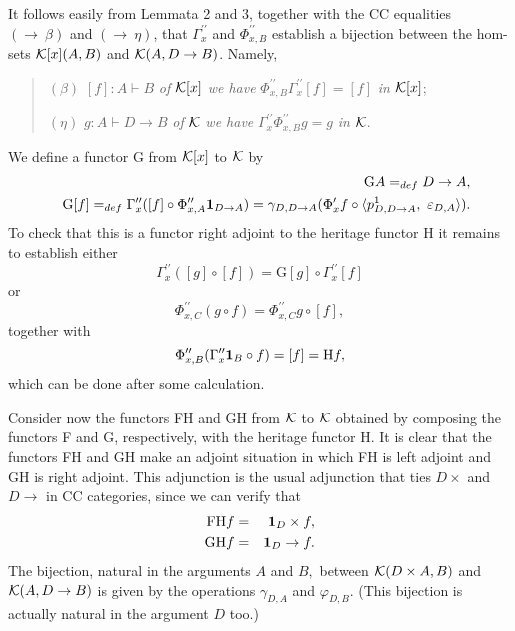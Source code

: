 \noindent It follows easily from Lemmata 2 and 3, together with the CC
equalities $(\rightarrow ~\beta )$ and $(\rightarrow ~\eta )$, that $\Gamma
_{x}^{\prime \prime }$ and $\Phi _{x,B}^{\prime \prime }$ establish a
bijection between the hom-sets ${\cal K}[x](A,B)$ and ${\cal K}%
(A,D\rightarrow B)$. Namely,

\begin{quotation}
\noindent $(\beta )$ $[f]:A\vdash B$ {\it of} ${\cal K}%
[x]$ {\it we have} $\Phi _{x,B}^{\prime \prime }\Gamma _{x}^{\prime \prime
}[f]=[f]$ {\it in} ${\cal K}[x]$;\medskip

\noindent $(\eta )$ $g:A\vdash D\rightarrow B$ {\it of} 
${\cal K}$ {\it we have} $\Gamma _{x}^{\prime \prime }\Phi _{x,B}^{\prime
\prime }g=g$ {\it in} ${\cal K}$.
\end{quotation}

We define a functor G from ${\cal K}[x]$ to ${\cal K}$ by 
\begin{eqnarray*}
&&\text{G}A=_{def}D\rightarrow A, \\
&&\text{G}[f]=_{def}\Gamma _{x}^{\prime \prime }([f]\circ \Phi
_{x,A}^{\prime \prime }{\bf 1}_{D\rightarrow A})=\gamma _{D,D\rightarrow
A}(\Phi _{x}^{\prime }f\circ \langle p_{D,D\rightarrow A}^{1},~\varepsilon
_{D,A}\rangle ).
\end{eqnarray*}
To check that this is a functor right adjoint to the heritage functor H it
remains to establish either 
\[
\Gamma _{x}^{\prime \prime }([g]\circ [f])=\text{G}[g]\circ \Gamma
_{x}^{\prime \prime }[f] 
\]
or 
\[
\Phi _{x,C}^{\prime \prime }(g\circ f)=\Phi _{x,C}^{\prime \prime }g\circ
[f], 
\]
together with 
\[
\Phi _{x,B}^{\prime \prime }(\Gamma _{x}^{\prime \prime }{\bf 1}_{B}\circ
f)=[f]=\text{H}f, 
\]
which can be done after some calculation.

Consider now the functors FH and GH from ${\cal K}$ to ${\cal K}$ obtained
by composing the functors F and G, respectively, with the heritage functor
H. It is clear that the functors FH and GH make an adjoint situation in
which FH is left adjoint and GH is right adjoint. This adjunction is the
usual adjunction that ties $D\times $ and $D\rightarrow $ in CC categories,
since we can verify that 
\begin{eqnarray*}
\text{FH}f &=&{\bf 1}_{D}\times f, \\
\text{GH}f &=&{\bf 1}_{D}\rightarrow f.
\end{eqnarray*}
The bijection, natural in the arguments $A$ and $B,$ between ${\cal K}%
(D\times A,B)$ and ${\cal K}(A,D\rightarrow B)$ is given by the operations $%
\gamma _{D,A}$ and $\varphi _{D,B}$. (This bijection is actually natural in
the argument $D$ too.)

